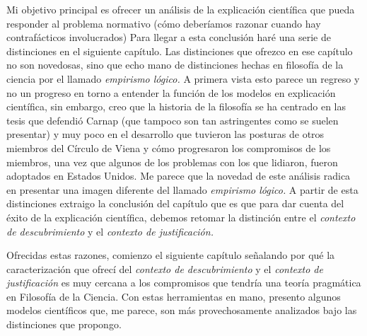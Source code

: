 Mi objetivo principal es ofrecer un análisis de la
explicación científica que pueda responder al problema
normativo (cómo deberíamos razonar cuando hay contrafácticos
involucrados) Para llegar a esta conclusión haré una serie
de distinciones en el siguiente capítulo. Las distinciones
que ofrezco en ese capítulo no son novedosas, sino que
echo mano de distinciones hechas en filosofía de la
ciencia por el llamado \emph{empirismo lógico.} A primera
vista esto parece un regreso y no un progreso en torno a
entender la función de los modelos en explicación
científica, sin embargo, creo que la historia de la
filosofía se ha centrado en las tesis que defendió Carnap
(que tampoco son tan astringentes como se suelen presentar)
y muy poco en el desarrollo que tuvieron las posturas de
otros miembros del Círculo de Viena y cómo progresaron los
compromisos de los miembros, una vez que algunos de los
problemas con los que lidiaron, fueron adoptados en Estados
Unidos. Me parece que la novedad de este análisis radica en
presentar una imagen diferente del llamado \emph{empirismo
lógico.} A partir de esta distinciones extraigo la
conclusión del capítulo que es que para dar cuenta del éxito
de la explicación científica, debemos retomar la distinción
entre el \emph{contexto de descubrimiento} y el
\emph{contexto de justificación.}

Ofrecidas estas razones, comienzo el siguiente capítulo
señalando por qué la caracterización que ofrecí del
\emph{contexto de descubrimiento} y el \emph{contexto de
justificación} es muy cercana a los compromisos que tendría
una teoría pragmática en Filosofía de la Ciencia. Con estas
herramientas en mano, presento algunos modelos científicos
que, me parece, son más provechosamente analizados bajo las
distinciones que propongo. 

